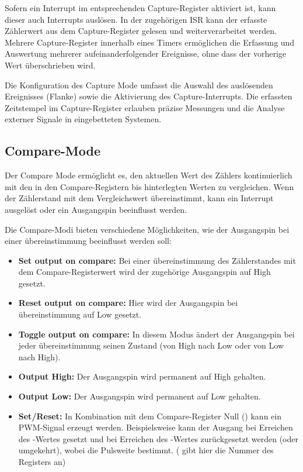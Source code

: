 Sofern ein Interrupt im entsprechenden Capture-Register aktiviert ist, kann dieser auch Interrupts ausl\"osen. In der zugeh\"origen ISR kann der erfasste Z\"ahlerwert aus dem Capture-Register gelesen und weiterverarbeitet werden. Mehrere Capture-Register innerhalb eines Timers erm\"oglichen die Erfassung und Auswertung mehrerer aufeinanderfolgender Ereignisse, ohne dass der vorherige Wert \"uberschrieben wird. 

Die Konfiguration des Capture Mode umfasst die Auswahl des ausl\"osenden Ereignisses (Flanke) sowie \ggf die Aktivierung des Capture-Interrupts. Die erfassten Zeitstempel im Capture-Register erlauben pr\"azise Messungen und die Analyse externer Signale in eingebetteten Systemen. \\

\vspace{1.25cm}
\subsection{Compare-Mode}
\label{sec:Timer_CompareMode}

Der Compare Mode erm\"oglicht es, den aktuellen Wert des Z\"ahlers kontinuierlich mit den in den Compare-Registern  bis  hinterlegten Werten zu vergleichen. Wenn der Z\"ahlerstand mit dem Vergleichswert \"ubereinstimmt, kann \zB ein Interrupt ausgel\"ost oder ein Ausgangspin beeinflusst werden.

\newpage
Die Compare-Modi bieten verschiedene M\"oglichkeiten, wie der Ausgangspin bei einer \"ubereinstimmung beeinflusst werden soll:

\begin{itemize}
	\item \textbf{Set output on compare:} Bei einer \"ubereinstimmung des Z\"ahlerstandes mit dem Compare-Registerwert wird der zugeh\"orige Ausgangspin auf High gesetzt.

	\item \textbf{Reset output on compare:} Hier wird der Ausgangspin bei \"ubereinstimmung auf Low gesetzt.

	\item \textbf{Toggle output on compare:} In diesem Modus \"andert der Ausgangspin bei jeder \"ubereinstimmung seinen Zustand (von High nach Low oder von Low nach High).

	\item \textbf{Output High:} Der Ausgangspin wird permanent auf High gehalten.

	\item \textbf{Output Low:} Der Ausgangspin wird permanent auf Low gehalten.

	\item \textbf{Set/Reset:} In Kombination mit dem Compare-Register Null () kann ein PWM-Signal erzeugt werden. Beispielsweise kann der Ausgang bei Erreichen des -Wertes gesetzt und bei Erreichen des -Wertes zur\"uckgesetzt werden (oder umgekehrt), wobei  die Pulsweite bestimmt. ( gibt hier die Nummer des Registers an)
\end{itemize}

